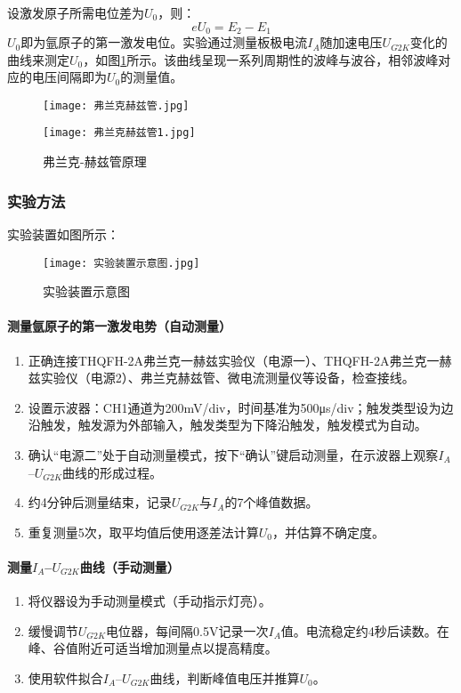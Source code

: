 \documentclass[]{../template/Report}%
\begin{document}
设激发原子所需电位差为$U_0$，则：
\begin{equation}
	eU_0 = E_2 - E_1
\end{equation}
$U_0$即为氩原子的第一激发电位。实验通过测量板极电流$I_A$随加速电压$U_{G2K}$变化的曲线来测定$U_0$，如图\ref{fig:弗兰克-赫兹管原理}所示。该曲线呈现一系列周期性的波峰与波谷，相邻波峰对应的电压间隔即为$U_0$的测量值。

\begin{figure}[H]
\centering
\begin{minipage}[b]{0.40\textwidth}
	\centering
	\texttt{[image: 弗兰克赫兹管.jpg]}
\end{minipage}\hfill
\begin{minipage}[b]{0.40\textwidth}
	\centering
	\texttt{[image: 弗兰克赫兹管1.jpg]}
\end{minipage}
\caption{弗兰克-赫兹管原理}
\label{fig:弗兰克-赫兹管原理}
\end{figure}
\subsubsection{实验方法}
实验装置如图所示：
\begin{figure}[H]
\centering
\texttt{[image: 实验装置示意图.jpg]}
\caption{实验装置示意图}
\label{fig:实验装置示意图}
\end{figure}
\paragraph{测量氩原子的第一激发电势（自动测量）}
\begin{enumerate}
\item 正确连接THQFH-2A弗兰克一赫兹实验仪（电源一）、THQFH-2A弗兰克一赫兹实验仪（电源2）、弗兰克赫兹管、微电流测量仪等设备，检查接线。
\item 设置示波器：CH1通道为200mV/div，时间基准为500μs/div；触发类型设为边沿触发，触发源为外部输入，触发类型为下降沿触发，触发模式为自动。
\item 确认“电源二”处于自动测量模式，按下“确认”键启动测量，在示波器上观察$I_A$–$U_{G2K}$曲线的形成过程。
\item 约4分钟后测量结束，记录$U_{G2K}$与$I_A$的7个峰值数据。
\item 重复测量5次，取平均值后使用逐差法计算$U_0$，并估算不确定度。
\end{enumerate}

\paragraph{测量$I_A$–$U_{G2K}$曲线（手动测量）}
\begin{enumerate}
\item 将仪器设为手动测量模式（手动指示灯亮）。
\item 缓慢调节$U_{G2K}$电位器，每间隔0.5V记录一次$I_A$值。电流稳定约4秒后读数。在峰、谷值附近可适当增加测量点以提高精度。
\item 使用软件拟合$I_A$–$U_{G2K}$曲线，判断峰值电压并推算$U_0$。
\end{enumerate}
\end{document}
